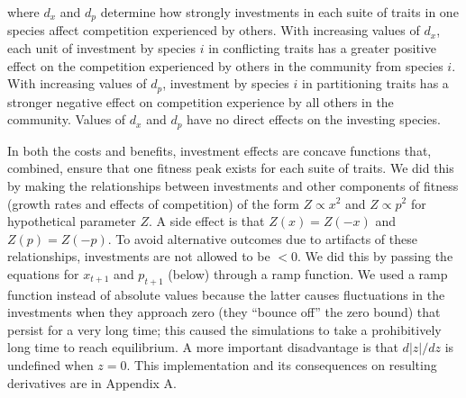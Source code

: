 \noindent where $d_x$ and $d_p$ determine how strongly investments in each 
suite of traits in one species affect competition experienced by others.
With increasing values of $d_x$, each unit of investment by species $i$ in 
conflicting traits has a greater positive effect on the competition 
experienced by others in the community from species $i$.
With increasing values of $d_p$, investment by species $i$ in partitioning
traits has a stronger negative effect on competition experience by all 
others in the community.
Values of $d_x$ and $d_p$ have no direct effects on the investing species.



In both the costs and benefits, investment effects are concave functions that,
combined, ensure that one fitness peak exists for each suite of traits.
We did this by making the relationships between investments and other 
components of fitness (growth rates and effects of competition) of the form
$Z \propto x^2$ and $Z \propto p^2$ for hypothetical parameter $Z$.
A side effect is that $Z(x) = Z(-x)$ and $Z(p) = Z(-p)$.
To avoid alternative outcomes due to artifacts of these relationships,
investments are not allowed to be $< 0$.
We did this by passing the equations for $x_{t+1}$ and $p_{t+1}$ (below) 
through a ramp function.
We used a ramp function instead of absolute values
because the latter causes fluctuations
in the investments when they approach zero (they ``bounce off''
the zero bound) that persist for a very long time;
this caused the simulations to take a prohibitively long time to reach
equilibrium.
A more important disadvantage is that $d \lvert z \rvert / dz$ is
undefined when $z = 0$.
This implementation and its consequences on resulting derivatives are in
Appendix A.






%



